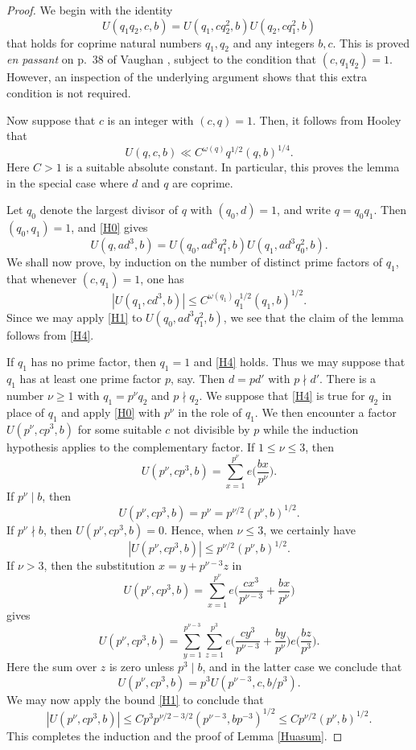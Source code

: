 \documentclass[reqno]{amsart}
\numberwithin{equation}{section}
\begin{document}
\begin{proof} We begin with the identity
\begin{equation}\label{H0} U(q_1q_2,c,b) = U(q_1,cq_2^2,b) U(q_2,cq_1^2,b) \end{equation}
that holds for coprime natural numbers $q_1,q_2$ and any integers $b,c$. This is  proved {\em en passant} on p.\ 38 of Vaughan \cite{hlm}, subject to the condition that $(c,q_1 q_2)=1$. However, an inspection of the underlying argument shows that this extra condition is not required. 


Now suppose that $c$ is an integer with $(c,q)=1$. Then, it follows from Hooley \cite[eqn.\ (43)]{Hacta} that 
\begin{equation}\label{H1} U(q,c,b) \ll C^{\omega(q)} q^{1/2} (q,b)^{1/4}. \end{equation}
Here $C>1$ is a suitable absolute constant. In particular, this proves the lemma in the special case where $d$ and $q$ are coprime.

Let $q_0$ denote the largest divisor of $q$ with $(q_0,d)=1$, and write $q=q_0 q_1$. Then $(q_0,q_1)=1$, and \eqref{H0} gives 
$$ U(q,ad^3,b) = U(q_0, ad^3q_1^2,b) U(q_1,ad^3q_0^2,b). $$
We shall now prove, by induction on the number of distinct prime factors of $q_1$, that whenever $(c,q_1)=1$, one has
\begin{equation}\label{H4} |U(q_1,cd^3,b)|\le C^{\omega(q_1)}q_1^{1/2}(q_1,b)^{1/2}. \end{equation}
Since we may apply \eqref{H1} to $U(q_0,ad^3q_1^2,b)$, we see that the claim of the lemma follows from \eqref{H4}.

If $q_1$ has no prime factor, then $q_1=1$ and \eqref{H4} holds. Thus we may suppose that $q_1$ has at least one prime factor $p$, say. Then $d=pd'$ with $p\nmid d'$. There is a number $\nu\ge 1$ with $q_1=p^\nu q_2$ and $p\nmid q_2$. We suppose that \eqref{H4} is true for $q_2$ in place of $q_1$ and apply \eqref{H0} with $p^\nu$ in the role of $q_1$. We then encounter a factor
$ U(p^\nu, cp^3,b)$ for some suitable $c$ not divisible by $p$ while the induction hypothesis applies to the complementary factor. 
If $1\le \nu\le 3$, then
$$ U(p^\nu, cp^3, b) = \sum_{x=1}^{p^\nu} e\Big(\frac{bx}{p^\nu}\Big). $$
If $p^\nu\mid b$, then 
$$ U(p^\nu, cp^3, b) = p^\nu = p^{\nu/2} (p^\nu,b)^{1/2}. $$
If $p^\nu\nmid b$, then $U(p^\nu, cp^3,b) =0$. Hence, when $\nu\le 3$, we certainly have
$$ |U(p^\nu, cp^3, b)|\le p^{\nu/2}(p^\nu,b)^{1/2}. $$
If $\nu>3$, then the substitution $x= y+p^{\nu-3}z$ in
$$ U(p^\nu,cp^3,b) = \sum_{x=1}^{p^\nu} e\Big(\frac{cx^3}{p^{\nu-3}} +\frac{bx}{p^\nu}\Big) $$
gives
$$ U(p^\nu,cp^3,b) =
\sum_{y=1}^{p^{\nu-3}} \sum_{z=1}^{p^3} e\Big(\frac{cy^3}{p^{\nu-3}} + \frac{by}{p^\nu}\Big) e\Big(\frac{bz}{p^3}\Big). $$
Here the sum over $z$ is zero unless $p^3\mid b$, and in the latter case we conclude that
$$  U(p^\nu,cp^3,b) = p^3 U(p^{\nu-3}, c,b/p^3). $$
We may now apply the bound \eqref{H1} to conclude that
$$  |U(p^\nu,cp^3,b)| \le C p^3 p^{\nu/2 -3/2} (p^{\nu-3}, bp^{-3})^{1/2} \le C p^{\nu/2}(p^\nu,b)^{1/2}. $$
This completes the induction and the proof of Lemma \ref{Huasum}.  
\end{proof}
\end{document}
